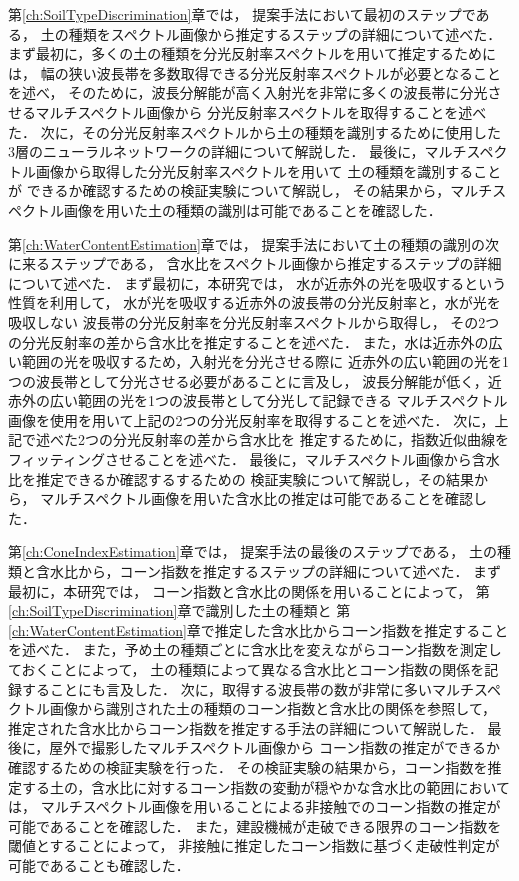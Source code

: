 第\ref{ch:SoilTypeDiscrimination}章では，
提案手法において最初のステップである，
土の種類をスペクトル画像から推定するステップの詳細について述べた．
%
まず最初に，多くの土の種類を分光反射率スペクトルを用いて推定するためには，
幅の狭い波長帯を多数取得できる分光反射率スペクトルが必要となることを述べ，
そのために，波長分解能が高く入射光を非常に多くの波長帯に分光させるマルチスペクトル画像から
分光反射率スペクトルを取得することを述べた．
%
次に，その分光反射率スペクトルから土の種類を識別するために使用した
3層のニューラルネットワークの詳細について解説した．
% 
最後に，マルチスペクトル画像から取得した分光反射率スペクトルを用いて
土の種類を識別することが
できるか確認するための検証実験について解説し，
その結果から，マルチスペクトル画像を用いた土の種類の識別は可能であることを確認した．

第\ref{ch:WaterContentEstimation}章では，
提案手法において土の種類の識別の次に来るステップである，
含水比をスペクトル画像から推定するステップの詳細について述べた．
%
まず最初に，本研究では，
水が近赤外の光を吸収するという性質を利用して，
水が光を吸収する近赤外の波長帯の分光反射率と，水が光を吸収しない
波長帯の分光反射率を分光反射率スペクトルから取得し，
その2つの分光反射率の差から含水比を推定することを述べた．
%
また，水は近赤外の広い範囲の光を吸収するため，入射光を分光させる際に
近赤外の広い範囲の光を1つの波長帯として分光させる必要があることに言及し，
波長分解能が低く，近赤外の広い範囲の光を1つの波長帯として分光して記録できる
マルチスペクトル画像を使用を用いて上記の2つの分光反射率を取得することを述べた．
次に，上記で述べた2つの分光反射率の差から含水比を
推定するために，指数近似曲線をフィッティングさせることを述べた．
%
最後に，マルチスペクトル画像から含水比を推定できるか確認するするための
検証実験について解説し，その結果から，
マルチスペクトル画像を用いた含水比の推定は可能であることを確認した．

第\ref{ch:ConeIndexEstimation}章では，
提案手法の最後のステップである，
土の種類と含水比から，コーン指数を推定するステップの詳細について述べた．
% 
まず最初に，本研究では，
コーン指数と含水比の関係を用いることによって，
第\ref{ch:SoilTypeDiscrimination}章で識別した土の種類と
第\ref{ch:WaterContentEstimation}章で推定した含水比からコーン指数を推定することを述べた．
また，予め土の種類ごとに含水比を変えながらコーン指数を測定しておくことによって，
土の種類によって異なる含水比とコーン指数の関係を記録することにも言及した．
% 
次に，取得する波長帯の数が非常に多いマルチスペクトル画像から識別された土の種類のコーン指数と含水比の関係を参照して，
推定された含水比からコーン指数を推定する手法の詳細について解説した．
% 
最後に，屋外で撮影したマルチスペクトル画像から
コーン指数の推定ができるか確認するための検証実験を行った．
その検証実験の結果から，コーン指数を推定する土の，含水比に対するコーン指数の変動が穏やかな含水比の範囲においては，
マルチスペクトル画像を用いることによる非接触でのコーン指数の推定が
可能であることを確認した．
また，建設機械が走破できる限界のコーン指数を閾値とすることによって，
非接触に推定したコーン指数に基づく走破性判定が可能であることも確認した．

